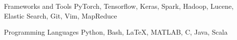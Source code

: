 

\begin{cvskills}




  \cvskill
    {Frameworks and Tools} %
    {PyTorch, Tensorflow, Keras, Spark, Hadoop, Lucene, Elastic Search, Git, Vim, MapReduce} %
    
  \cvskill
    {Programming Languages} %
    {Python, Bash, LaTeX, MATLAB, C, Java, Scala} %


\end{cvskills}
